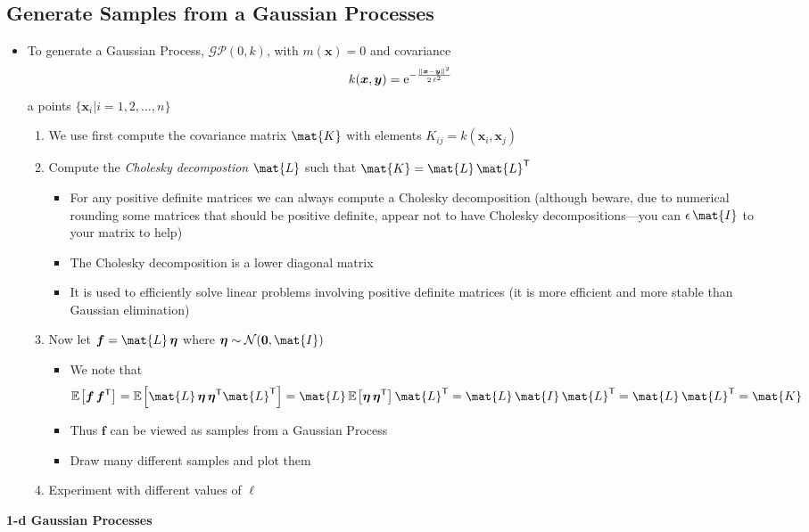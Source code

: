 \documentclass[11pt]{article}
\newcommand{\tr}{\textsf{T}}
\newcommand{\av}[2][]{\mathbb{E}_{#1\!}\left[ #2 \right]}
\newcommand{\e}[1]{{\rm e}^{#1}}
\begin{document}
\subsection{Generate Samples from a Gaussian Processes}
\label{sec:org18cdbe1}
\begin{itemize}
\item To generate a Gaussian Process, \(\mathcal{GP}(0,k)\), with
\(m(\bm{x})=0\) and covariance
$$ k(\bm{x},\bm{y})=\e{-\frac{\|\bm{x}-\bm{y}\|^2}{2\,\ell^2}} $$
a points \(\{\bm{x}_i|i=1, 2, \ldots, n\}\)
\begin{enumerate}
\item We use first compute the covariance matrix \(\mat{K}\) with
elements \(K_{ij} = k(\bm{x}_i,\bm{x}_j)\)
\item Compute the \emph{Cholesky decompostion} \(\mat{L}\) such that
\(\mat{K} = \mat{L}\,\mat{L}^\tr\)
\begin{itemize}
\item For any positive definite matrices we can always compute a
Cholesky decomposition (although beware, due to numerical
rounding some matrices that should be positive definite,
appear not to have Cholesky decompositions---you can
\(\epsilon \,\mat{I}\) to your matrix to help)
\item The Cholesky decomposition is a lower diagonal matrix
\item It is used to efficiently solve linear problems involving
positive definite matrices (it is more efficient and more
stable than Gaussian elimination)
\end{itemize}
\item Now let \(\bm{f} = \mat{L}\,\bm{\eta}\) where \(\bm{\eta}\sim
        \mathcal{N}(\bm{0},\mat{I})\)
\begin{itemize}
\item We note that
$$ \av{\bm{f}\,\bm{f}^\tr} = \av{\mat{L}\,\bm{\eta}\,\bm{\eta}^\tr\mat{L}^\tr}
	  = \mat{L}\,\av{\bm{\eta}\,\bm{\eta}^\tr} \mat{L}^\tr
	  = \mat{L}\,\mat{I}\,\mat{L}^\tr =\mat{L}\,\mat{L}^\tr =
          \mat{K} $$
\item Thus \(\bm{f}\) can be viewed as samples from a Gaussian Process
\item Draw many different samples and plot them
\end{itemize}
\item Experiment with different values of \(\ell\)
\end{enumerate}
\end{itemize}

\textbf{1-d Gaussian Processes}
\end{document}
